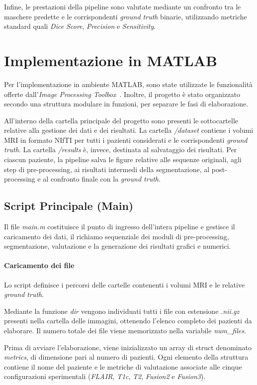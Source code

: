 Infine, le prestazioni della pipeline sono valutate mediante un confronto tra le maschere predette e le corrispondenti \textit{ground truth} binarie, utilizzando metriche standard quali \textit{Dice Score}, \textit{Precision} e \textit{Sensitivity}.

\section{Implementazione in MATLAB}
Per l'implementazione in ambiente MATLAB, sono state utilizzate le funzionalità offerte dall’\textit{Image Processing Toolbox}~\cite{matlab2025b}. Inoltre, il progetto è stato organizzato secondo una struttura modulare in funzioni, per separare le fasi di elaborazione.

All’interno della cartella principale del progetto sono presenti le sottocartelle relative alla gestione dei dati e dei risultati. La cartella \textit{/dataset} contiene i volumi MRI in formato NIfTI per tutti i pazienti considerati e le corrispondenti \textit{ground truth}. La cartella \textit{/results} è, invece, destinata al salvataggio dei risultati. Per ciascun paziente, la pipeline salva le figure relative alle sequenze originali, agli step di pre-processing, ai risultati intermedi della segmentazione, al post-processing e al confronto finale con la \textit{ground truth}.

\subsection{Script Principale (Main)}
Il file \textit{main.m} costituisce il punto di ingresso dell’intera pipeline e gestisce il caricamento dei dati, il richiamo sequenziale dei moduli di pre-processing, segmentazione, valutazione e la generazione dei risultati grafici e numerici.

\paragraph{Caricamento dei file}
Lo script definisce i percorsi delle cartelle contenenti i volumi MRI e le relative \textit{ground truth}.

Mediante la funzione \textit{dir} vengono individuati tutti i file con estensione \textit{.nii.gz} presenti nella cartella delle immagini, ottenendo l’elenco completo dei pazienti da elaborare. Il numero totale dei file viene memorizzato nella variabile \textit{num\_files}.

Prima di avviare l’elaborazione, viene inizializzato un array di struct denominato \textit{metrics}, di dimensione pari al numero di pazienti. Ogni elemento della struttura contiene il nome del paziente e le metriche di valutazione associate alle cinque configurazioni sperimentali (\textit{FLAIR}, \textit{T1c}, \textit{T2}, \textit{Fusion2} e \textit{Fusion3}).

